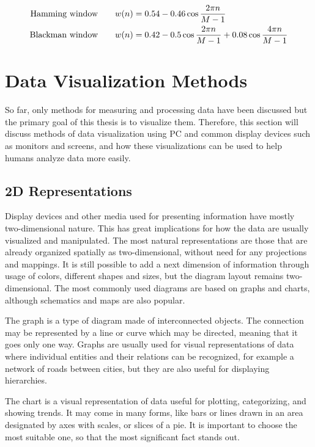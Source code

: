 \begin{align}
\text{Hamming window\qquad}& w(n) = 0.54 - 0.46\cos \frac{2 \pi n}{M -1} \label{eq:hammWind}\\
\text{Blackman window\qquad}& w(n) = 0.42 - 0.5\cos \frac{2 \pi n}{M - 1} + 0.08\cos \frac{4 \pi n}{M - 1} \label{eq:blackWind}
\end{align}

\section{Data Visualization Methods}
So far, only methods for measuring and processing data have been
discussed but the primary goal of this thesis is to visualize them. Therefore, this section will discuss methods of data visualization using PC and common
display devices such as monitors and screens, and how these visualizations can
be used to help humans analyze data more easily.

\subsection{2D Representations}
Display devices and other media used for presenting information have mostly
two-dimensional nature. This has great implications for how the data are usually
visualized and manipulated. The most natural representations are those that are
already organized spatially as two-dimensional, without need for any projections
and mappings. It is still possible to add a next dimension of information through usage of
colors, different shapes and sizes, but the diagram layout remains two-dimensional. The most commonly used diagrams are based on
graphs and charts, although schematics and maps are also popular.

The graph is a type of diagram made of interconnected objects. The connection
may be represented by a line or curve which may be directed, meaning that it
goes only one way. Graphs are usually used for visual representations of data
where individual entities and their relations can be recognized, for example a
network of roads between cities, but they are also useful for displaying
hierarchies.

The chart is a visual representation of data useful for plotting, categorizing,
and showing trends. It may come in many forms, like bars or lines drawn in an
area designated by axes with scales, or slices of a pie. It is important to choose
the most suitable one, so that the most significant fact stands out.

